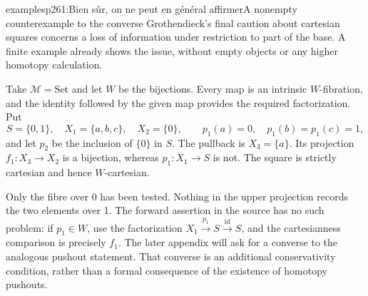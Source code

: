 \begin{dcomment}{examples}{p261:Bien sûr, on ne peut en général affirmer}{A nonempty counterexample to the converse}
Grothendieck's final caution about cartesian squares concerns a loss of information under restriction to part of the base. A finite example already shows the issue, without empty objects or any higher homotopy calculation.

Take $\mathcal M=\mathrm{Set}$ and let $W$ be the bijections. Every map is an intrinsic $W$-fibration, and the identity followed by the given map provides the required factorization. Put
\[
 S=\{0,1\},\quad X_1=\{a,b,c\},\quad X_2=\{0\},
 \qquad p_1(a)=0,\quad p_1(b)=p_1(c)=1,
\]
and let $p_2$ be the inclusion of $\{0\}$ in $S$. The pullback is $X_3=\{a\}$. Its projection $f_1:X_3\to X_2$ is a bijection, whereas $p_1:X_1\to S$ is not. The square is strictly cartesian and hence $W$-cartesian.

Only the fibre over 0 has been tested. Nothing in the upper projection records the two elements over 1. The forward assertion in the source has no such problem: if $p_1\in W$, use the factorization $X_1\xrightarrow{p_1}S\xrightarrow{\mathrm{id}}S$, and the cartesianness comparison is precisely $f_1$. The later appendix will ask for a converse to the analogous pushout statement. That converse is an additional conservativity condition, rather than a formal consequence of the existence of homotopy pushouts.
\end{dcomment}


